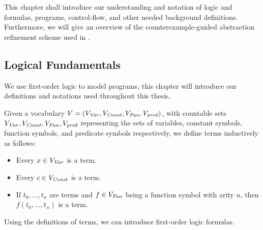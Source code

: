 
\begin{comment}
	This chapter is mostly focused on trace abstraction $\rightarrow$  It introduces the reader to the concept of trace abstraction. \\
	- Introduce logic, logical variables, terms, formulas, transition formulas with primed and unprimed variables, programs, program states, loops $\rightarrow$  then program-, error traces, feasible and infeasible counterexamples, CFGs, interpolants. \\ - From intuitive to true definitions. \\
	Here the running example from the introduction gets dissected to illustrate the definitions. \\ 
	Further the problems loops can cause are introduced, followed by a definition of loop summaries $\rightarrow$ introduction reflexive transitive closure of a formula 
	15 pages
\end{comment}

This chapter shall introduce our understanding and notation of logic and formulas, programs, control-flow, and other needed background definitions. Furthermore, we will give an overview of the \traceabstraction \cite{10.1007/978-3-642-03237-0_7} counterexample-guided abstraction refinement scheme used in \ultimate.

\subsection{Logical Fundamentals}
We use first-order logic to model programs, this chapter will introduce our definitions and notations used throughout this thesis.
\begin{mydef}[Term] 
	Given a vocabulary $V = (V_{\mathit{Var}}, V_{\mathit{Const}}, V_{\mathit{Fun}}, V_{\mathit{pred}})$, with countable sets $V_{\mathit{\mathit{Var}}}, V_{\mathit{Const}}, V_{\mathit{Fun}}, V_{\mathit{pred}}$ representing the sets of variables, constant symbols, function symbols, and predicate symbols respectively, we define terms inductively as follows:
	\begin{itemize}
		\item Every $x \in V_{\mathit{Var}}$ is a term.
		\item Every $c \in V_{\mathit{Const}}$ is a term.
		\item If $t_0, \ldots, t_n$ are terms and $f \in V_{\mathit{Fun}}$ being a function symbol with arity $n$, then $f(t_0, \ldots, t_n)$ is a term.
	\end{itemize}
\end{mydef} \vspace*{1cm} \par
Using the definitions of terms, we can introduce first-order logic formulas.

